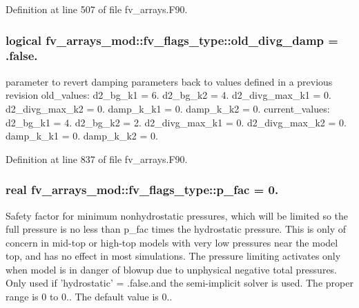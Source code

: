 Definition at line 507 of file fv\-\_\-arrays.\-F90.

\subsubsection[{old\-\_\-divg\-\_\-damp}]{\setlength{\rightskip}{0pt plus 5cm}logical fv\-\_\-arrays\-\_\-mod\-::fv\-\_\-flags\-\_\-type\-::old\-\_\-divg\-\_\-damp = .false.}\label{structfv__arrays__mod_1_1fv__flags__type_a2431d9bbce3aee3c96d0d5129d87e174}


parameter to revert damping parameters back to values defined in a previous revision old\-\_\-values\-: d2\-\_\-bg\-\_\-k1 = 6. d2\-\_\-bg\-\_\-k2 = 4. d2\-\_\-divg\-\_\-max\-\_\-k1 = 0. d2\-\_\-divg\-\_\-max\-\_\-k2 = 0. damp\-\_\-k\-\_\-k1 = 0. damp\-\_\-k\-\_\-k2 = 0. current\-\_\-values\-: d2\-\_\-bg\-\_\-k1 = 4. d2\-\_\-bg\-\_\-k2 = 2. d2\-\_\-divg\-\_\-max\-\_\-k1 = 0. d2\-\_\-divg\-\_\-max\-\_\-k2 = 0. damp\-\_\-k\-\_\-k1 = 0. damp\-\_\-k\-\_\-k2 = 0. 



Definition at line 837 of file fv\-\_\-arrays.\-F90.

\subsubsection[{p\-\_\-fac}]{\setlength{\rightskip}{0pt plus 5cm}real fv\-\_\-arrays\-\_\-mod\-::fv\-\_\-flags\-\_\-type\-::p\-\_\-fac = 0.}\label{structfv__arrays__mod_1_1fv__flags__type_ac29dc9f75f651c3777e252afcbbe5529}


Safety factor for minimum nonhydrostatic pressures, which will be limited so the full pressure is no less than p\-\_\-fac times the hydrostatic pressure. This is only of concern in mid-\/top or high-\/top models with very low pressures near the model top, and has no effect in most simulations. The pressure limiting activates only when model is in danger of blowup due to unphysical negative total pressures. Only used if 'hydrostatic' = .false.\-and the semi-\/implicit solver is used. The proper range is 0 to 0.. The default value is 0.. 



